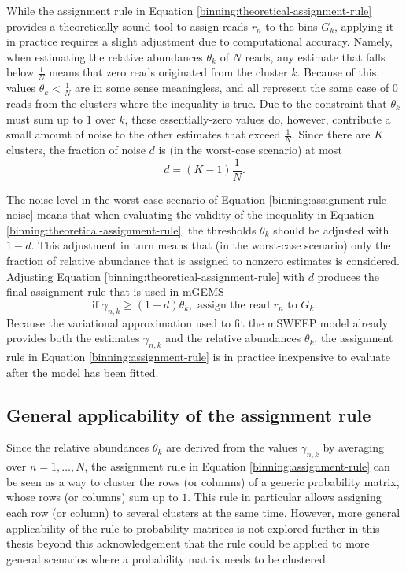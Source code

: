 \documentclass[officiallayout]{tktla}
\begin{document}
While the assignment rule in Equation
\eqref{binning:theoretical-assignment-rule} provides a theoretically
sound tool to assign reads $r_{n}$ to the bins $G_{k}$, applying it in
practice requires a slight adjustment due to computational
accuracy. Namely, when estimating the relative abundances $\theta_{k}$
of $N$ reads, any estimate that falls below $\frac{1}{N}$ means that
zero reads originated from the cluster $k$. Because of this, values
$\theta_{k} < \frac{1}{N}$ are in some sense meaningless, and all
represent the same case of 0 reads from the clusters where the
inequality is true. Due to the constraint that $\theta_{k}$ must sum
up to $1$ over $k$, these essentially-zero values do, however,
contribute a small amount of noise to the other estimates that exceed
$\frac{1}{N}$. Since there are $K$ clusters, the fraction of noise $d$
is (in the worst-case scenario) at most
\begin{equation}
  \label{binning:assignment-rule-noise}
  d = (K - 1)\frac{1}{N}.
\end{equation}

The noise-level in the worst-case scenario of Equation
\eqref{binning:assignment-rule-noise} means that when evaluating the
validity of the inequality in Equation
\eqref{binning:theoretical-assignment-rule}, the thresholds $\theta_k$
should be adjusted with $1 - d$. This adjustment in turn means that
(in the worst-case scenario) only the fraction of relative abundance
that is assigned to nonzero estimates is considered. Adjusting
Equation \eqref{binning:theoretical-assignment-rule} with $d$ produces
the final assignment rule that is used in mGEMS
\begin{equation}
  \label{binning:assignment-rule}
  \text{if } \gamma_{n, k} \geq (1 - d)\theta_{k}, \text{ assign the read } r_{n} \text{ to } G_{k}.
\end{equation}
Because the variational approximation used to fit the mSWEEP model
already provides both the estimates $\gamma_{n, k}$ and the relative
abundances $\theta_{k}$, the assignment rule in Equation
\eqref{binning:assignment-rule} is in practice inexpensive to
evaluate after the model has been fitted.

\subsection{General applicability of the assignment rule}

Since the relative abundances $\theta_k$ are derived from the values
$\gamma_{n, k}$ by averaging over $n = 1, \dots, N$, the assignment
rule in Equation \eqref{binning:assignment-rule} can be seen as a way to
cluster the rows (or columns) of a generic probability matrix, whose
rows (or columns) sum up to $1$. This rule in particular allows
assigning each row (or column) to several clusters at the same
time. However, more general applicability of the rule to probability
matrices is not explored further in this thesis beyond this
acknowledgement that the rule could be applied to more general
scenarios where a probability matrix needs to be clustered.
\end{document}
